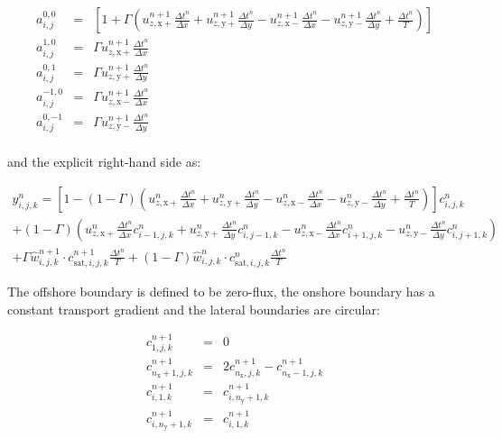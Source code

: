 \begin{equation}
  \label{eq:apx_implicitcoef}
  \begin{array}{rclcrcl}
    a^{0,0}_{i,j} &=& \left[1 + \Gamma \left( 
      u^{n+1}_{z,\mathrm{x+}} \frac{\Delta t^n}{\Delta x} +
      u^{n+1}_{z,\mathrm{y+}} \frac{\Delta t^n}{\Delta y} -
      u^{n+1}_{z,\mathrm{x-}} \frac{\Delta t^n}{\Delta x} - 
      u^{n+1}_{z,\mathrm{y-}} \frac{\Delta t^n}{\Delta y} +
      \frac{\Delta t^n}{T}
    \right) \right] \\
    a^{1,0}_{i,j} &=& \Gamma u^{n+1}_{z,\mathrm{x+}} \frac{\Delta t^n}{\Delta x} \\
    a^{0,1}_{i,j} &=& \Gamma u^{n+1}_{z,\mathrm{y+}} \frac{\Delta t^n}{\Delta y} \\
    a^{-1,0}_{i,j} &=& \Gamma u^{n+1}_{z,\mathrm{x-}} \frac{\Delta t^n}{\Delta x} \\
    a^{0,-1}_{i,j} &=& \Gamma u^{n+1}_{z,\mathrm{y-}} \frac{\Delta t^n}{\Delta y} \\
  \end{array}
\end{equation}

\noindent and the explicit right-hand side as:

\begin{multline}
  \label{eq:apx_explicitrhs}
  y^n_{i,j,k} = 
  \left[ 1 - (1 - \Gamma) \left( 
      u^n_{z,\mathrm{x+}} \frac{\Delta t^n}{\Delta x} + 
      u^n_{z,\mathrm{y+}} \frac{\Delta t^n}{\Delta y} -
      u^n_{z,\mathrm{x-}} \frac{\Delta t^n}{\Delta x} - 
      u^n_{z,\mathrm{y-}} \frac{\Delta t^n}{\Delta y} +
      \frac{\Delta t^n}{T}
    \right)
  \right] c^n_{i,j,k} \\ +
  (1 - \Gamma) \left(
    u^n_{z,\mathrm{x+}} \frac{\Delta t^n}{\Delta x} c^n_{i-1,j,k} + 
    u^n_{z,\mathrm{y+}} \frac{\Delta t^n}{\Delta y} c^n_{i,j-1,k} -
    u^n_{z,\mathrm{x-}} \frac{\Delta t^n}{\Delta x} c^n_{i+1,j,k} - 
    u^n_{z,\mathrm{y-}} \frac{\Delta t^n}{\Delta y} c^n_{i,j+1,k} 
  \right) \\ + 
  \Gamma \hat{w}^{n+1}_{i,j,k} \cdot c^{n+1}_{\mathrm{sat},i,j,k} \frac{\Delta t^n}{T} +
  (1 - \Gamma) \hat{w}^n_{i,j,k} \cdot c^n_{\mathrm{sat},i,j,k} \frac{\Delta t^n}{T}
\end{multline}

\noindent The offshore boundary is defined to be zero-flux, the
onshore boundary has a constant transport gradient and the lateral
boundaries are circular:

\begin{equation}
  \label{eq:apx_boundaryconditions}
  \begin{array}{rclcrcl}
    c^{n+1}_{1,j,k} &=& 0 \\
    c^{n+1}_{n_{\mathrm{x}}+1,j,k} &=& 2 c^{n+1}_{n_{\mathrm{x}},j,k} - c^{n+1}_{n_{\mathrm{x}}-1,j,k} \\
    c^{n+1}_{i,1,k} &=& c^{n+1}_{i,n_{\mathrm{y}}+1,k} \\
    c^{n+1}_{i,n_{\mathrm{y}}+1,k} &=& c^{n+1}_{i,1,k} \\
  \end{array}
\end{equation}

